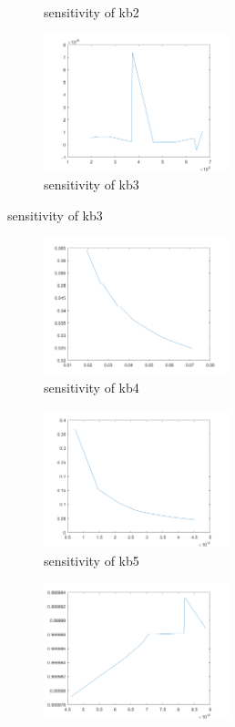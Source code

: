 \begin{figure}[H]
\begin{subfigure}{0.5\textwidth}
		\caption{sensitivity of kb2}
	\end{subfigure}%
	\begin{subfigure}{0.5\textwidth}
		\includegraphics[height=4cm]{b3.png}
		\caption{sensitivity of kb3}
	\end{subfigure}
\end{figure}

\begin{figure}[H]
	\begin{subfigure}{0.5\textwidth}
		\includegraphics[height=4cm]{b4.png}
		\caption{sensitivity of kb4}
	\end{subfigure}%
	\begin{subfigure}{0.5\textwidth}
		\includegraphics[height=4cm]{b5.png}
		\caption{sensitivity of kb5}
	\end{subfigure}
	\begin{subfigure}{0.5\textwidth}
		\includegraphics[height=4cm]{b6.png}

\end{subfigure}
\end{figure}

